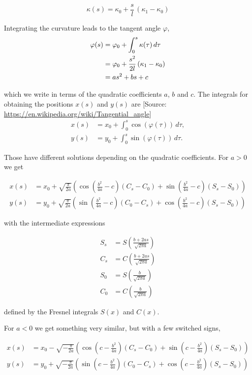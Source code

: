 \begin{equation}
\kappa(s) = \kappa_0 + \frac{s}{l}\,(\kappa_1 - \kappa_0)
\end{equation}

Integrating the curvature leads to the tangent angle $\varphi$,
%
\begin{align}
\varphi(s) &= \varphi_0 + \int_{0}^{s} \kappa(\tau)\,d\tau \notag \\
&= \varphi_0 + \frac{s^2}{2l}\,(\kappa_1 - \kappa_0) \notag \\
&= as^2 + bs + c
\end{align}

which we write in terms of the quadratic coefficients $a$, $b$ and $c$.
The integrals for obtaining the positions $x(s)$ and $y(s)$ are [Source: \url{https://en.wikipedia.org/wiki/Tangential_angle}]
%
\begin{align}
x(s) &= x_0 + \int_{0}^{s} \cos(\varphi(\tau))\,d\tau, \\
y(s) &= y_0 + \int_{0}^{s} \sin(\varphi(\tau))\,d\tau.
\end{align}

Those have different solutions depending on the quadratic coefficients.
For $a > 0$ we get

\begin{align}
x(s) &= x_0 + \sqrt{\frac{\pi}{2a}}\left(\cos\left(\frac{b^2}{4a} - c\right)(C_s - C_0) + \sin\left(\frac{b^2}{4a} - c\right)(S_s - S_0)\right) \\
y(s) &= y_0 + \sqrt{\frac{\pi}{2a}}\left(\sin\left(\frac{b^2}{4a} - c\right)(C_0 - C_s) + \cos\left(\frac{b^2}{4a} - c\right)(S_s - S_0)\right)
\end{align}

with the intermediate expressions

\begin{align}
S_s &= S\left(\frac{b + 2as}{\sqrt{2\pi a}}\right) \\
C_s &= C\left(\frac{b + 2as}{\sqrt{2\pi a}}\right) \\
S_0 &= S\left(\frac{b}{\sqrt{2\pi a}}\right) \\
C_0 &= C\left(\frac{b}{\sqrt{2\pi a}}\right)
\end{align}

defined by the Fresnel integrals $S(x)$ and $C(x)$.

For $a < 0$ we get something very similar, but with a few switched signs,

\begin{align}
x(s) &= x_0 - \sqrt{-\frac{\pi}{2a}}\left(\cos\left(c - \frac{b^2}{4a}\right)(C_s - C_0) + \sin\left(c - \frac{b^2}{4a}\right)(S_s - S_0)\right) \\
y(s) &= y_0 + \sqrt{-\frac{\pi}{2a}}\left(\sin\left(c - \frac{b^2}{4a}\right)(C_0 - C_s) + \cos\left(c - \frac{b^2}{4a}\right)(S_s - S_0)\right)
\end{align}

